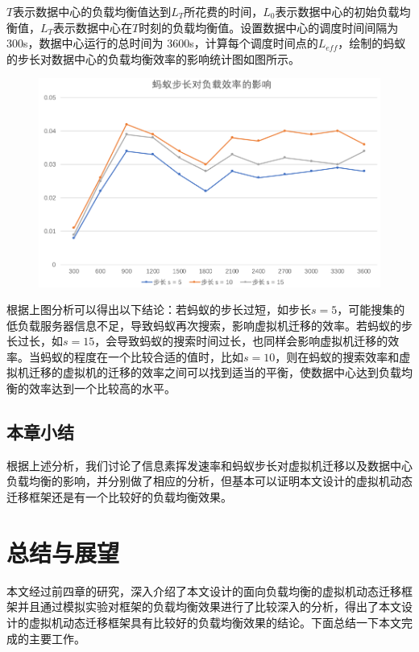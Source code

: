 $ T $表示数据中心的负载均衡值达到$ L_T $所花费的时间，$ L_0 $表示数据中心的初始负载均衡值，$ L_T $表示数据中心在$ T $时刻的负载均衡值。设置数据中心的调度时间间隔为 300s，数据中心运行的总时间为 3600s，计算每个调度时间点的$ L_{eff} $，绘制的蚂蚁的步长对数据中心的负载均衡效率的影响统计图如图所示。

\begin{figure}[htb]
  \centering
  \includegraphics{./Figure/IMG_Chap4_7.png}
\end{figure}

根据上图分析可以得出以下结论：若蚂蚁的步长过短，如步长$ s = 5 $，可能搜集的低负载服务器信息不足，导致蚂蚁再次搜索，影响虚拟机迁移的效率。若蚂蚁的步长过长，如$ s = 15 $，会导致蚂蚁的搜索时间过长，也同样会影响虚拟机迁移的效率。当蚂蚁的程度在一个比较合适的值时，比如$ s = 10 $，则在蚂蚁的搜索效率和虚拟机迁移的虚拟机的迁移的效率之间可以找到适当的平衡，使数据中心达到负载均衡的效率达到一个比较高的水平。

 \section{本章小结}
根据上述分析，我们讨论了信息素挥发速率和蚂蚁步长对虚拟机迁移以及数据中心负载均衡的影响，并分别做了相应的分析，但基本可以证明本文设计的虚拟机动态迁移框架还是有一个比较好的负载均衡效果。

\chapter{总结与展望}
本文经过前四章的研究，深入介绍了本文设计的面向负载均衡的虚拟机动态迁移框架并且通过模拟实验对框架的负载均衡效果进行了比较深入的分析，得出了本文设计的虚拟机动态迁移框架具有比较好的负载均衡效果的结论。下面总结一下本文完成的主要工作。

